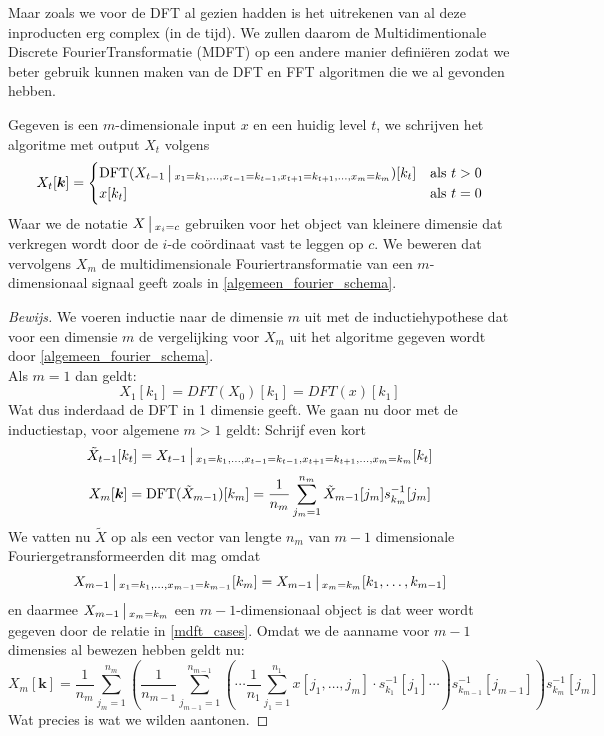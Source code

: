 Maar zoals we voor de DFT al gezien hadden is het uitrekenen van al deze inproducten erg complex (in de tijd).
We zullen daarom de Multidimentionale Discrete FourierTransformatie (MDFT) op een andere manier defini\"eren 
zodat we beter gebruik kunnen maken van de DFT en FFT algoritmen die we al gevonden hebben.

\begin{algo}
Gegeven is een $m$-dimensionale input $x$ en een huidig level $t$, 
we schrijven het algoritme met output $X_t$ volgens
\begin{equation}
  \label{mdft_cases}
  X_{t}[\boldsymbol k] = \begin{cases}
  \text{DFT}(X_{t-1}\,\big|\,_{x_1 = k_1,\ldots,x_{t-1} = k_{t-1},x_{t+1} = k_{t+1},\ldots,x_m =k_m})[k_t] & \text{als } t>0\\
  x[k_t] & \text{als } t=0
  \end{cases}
\end{equation}
Waar we de notatie $X\,\big|\,_{x_i=c}$ gebruiken voor het object van kleinere dimensie dat verkregen
wordt door de $i$-de co\"ordinaat vast te leggen op $c$.
We beweren dat vervolgens $X_m$ de multidimensionale Fouriertransformatie van een $m$-dimensionaal signaal geeft zoals
in \ref{algemeen_fourier_schema}.
\end{algo}
\begin{proof}[Bewijs]
We voeren inductie naar de dimensie $m$ uit met de inductiehypothese dat voor een dimensie $m$ 
de vergelijking voor $X_m$ uit het algoritme gegeven wordt door \ref{algemeen_fourier_schema}.\\ 
Als $m=1$ dan geldt:
\[
X_1[k_1] = DFT(X_0)[k_1] = DFT(x)[k_1]
\]
Wat dus inderdaad de DFT in 1 dimensie geeft.
We gaan nu door met de inductiestap, voor algemene $m>1$ geldt:
Schrijf even kort
\[
\tilde X_{t-1}[k_t] = 
X_{t-1}\,\big|\,_{x_1 = k_1,\ldots,x_{t-1} = k_{t-1},x_{t+1} = k_{t+1},\ldots,x_m =k_m}[k_t]
\]
\[
  X_m [\boldsymbol k] = 
  \text{DFT}(\tilde X_{m-1})[k_m]
  = \frac 1 {n_m}\sum_{j_m=1}^{n_m} \tilde X_{m-1}[j_m] s^{-1}_{k_m}[j_m]
\]
We vatten nu $\tilde X$ op als een vector van lengte $n_m$ van $m-1$ dimensionale Fouriergetransformeerden
dit mag omdat
\[
X_{m-1}\,\big|\,_{x_1=k_1,\ldots,x_{m-1}=k_{m-1}}[k_m] = X_{m-1}\,\big|\,_{x_m=k_m}[k_1,\ldots,k_{m-1}]
\]
en daarmee $X_{m-1}\,\big|\,_{x_m=k_m}$ een $m-1$-dimensionaal object is dat weer wordt gegeven door de relatie
in \ref{mdft_cases}.
Omdat we de aanname voor $m-1$ dimensies al bewezen hebben geldt nu:
\[
X_m[\boldsymbol k]  = \frac 1 {n_m}\sum_{j_m=1}^{n_m} 
\left( \frac 1 {n_{m-1}} \sum_{j_{m-1}=1}^{n_{m-1}} \left ( \cdots 
\frac 1 {n_1} \sum_{j_1=1}^{n_1} 
x[j_1,\ldots,j_m] 
\cdot s^{-1}_{k_1}[j_1]
\cdots \right ) s^{-1}_{k_{m-1}}[j_{m-1}] \right) 
s^{-1}_{k_m}[j_m]
\]
Wat precies is wat we wilden aantonen.
\end{proof}

